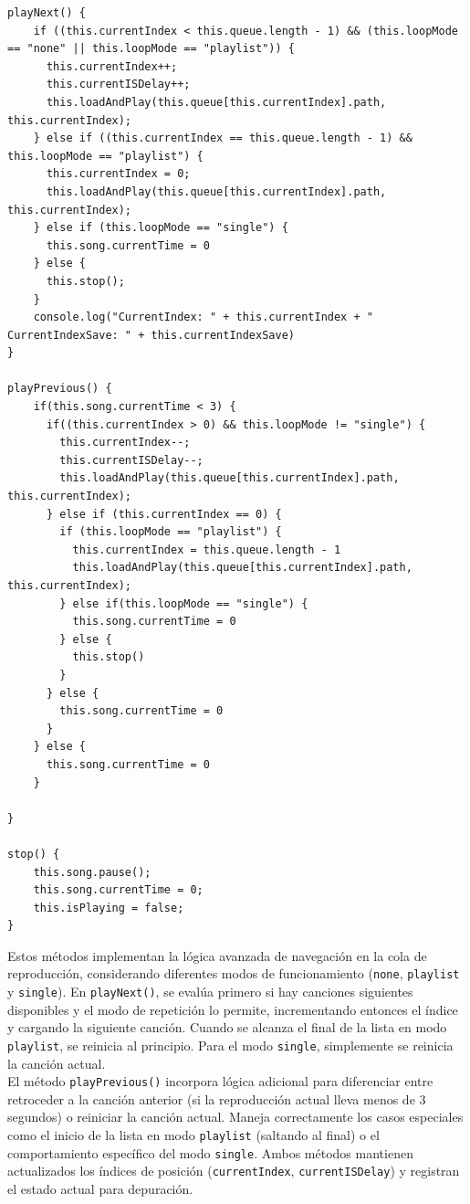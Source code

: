 \documentclass[11pt, a4paper]{article}
\begin{document}
                \begin{lstlisting}[caption={playNext() y playPrevious()}]
playNext() {
    if ((this.currentIndex < this.queue.length - 1) && (this.loopMode == "none" || this.loopMode == "playlist")) {
      this.currentIndex++;
      this.currentISDelay++;
      this.loadAndPlay(this.queue[this.currentIndex].path, this.currentIndex);
    } else if ((this.currentIndex == this.queue.length - 1) && this.loopMode == "playlist") {
      this.currentIndex = 0;
      this.loadAndPlay(this.queue[this.currentIndex].path, this.currentIndex);
    } else if (this.loopMode == "single") {
      this.song.currentTime = 0
    } else {
      this.stop();
    }
    console.log("CurrentIndex: " + this.currentIndex + " CurrentIndexSave: " + this.currentIndexSave)
}

playPrevious() {
    if(this.song.currentTime < 3) {
      if((this.currentIndex > 0) && this.loopMode != "single") {
        this.currentIndex--;
        this.currentISDelay--;
        this.loadAndPlay(this.queue[this.currentIndex].path, this.currentIndex);
      } else if (this.currentIndex == 0) {
        if (this.loopMode == "playlist") {
          this.currentIndex = this.queue.length - 1
          this.loadAndPlay(this.queue[this.currentIndex].path, this.currentIndex);
        } else if(this.loopMode == "single") {
          this.song.currentTime = 0
        } else {
          this.stop()
        }
      } else {
        this.song.currentTime = 0
      }
    } else {
      this.song.currentTime = 0
    }
    
}

stop() {
    this.song.pause();
    this.song.currentTime = 0;
    this.isPlaying = false;
}
                \end{lstlisting}

                Estos métodos implementan la lógica avanzada de navegación en la cola de reproducción, considerando diferentes modos de funcionamiento (\verb|none|, \verb|playlist| y \verb|single|). En \verb|playNext()|, se evalúa primero si hay canciones siguientes disponibles y el modo de repetición lo permite, incrementando entonces el índice y cargando la siguiente canción. Cuando se alcanza el final de la lista en modo \verb|playlist|, se reinicia al principio. Para el modo \verb|single|, simplemente se reinicia la canción actual. \\

                El método \verb|playPrevious()| incorpora lógica adicional para diferenciar entre retroceder a la canción anterior (si la reproducción actual lleva menos de 3 segundos) o reiniciar la canción actual. Maneja correctamente los casos especiales como el inicio de la lista en modo \verb|playlist| (saltando al final) o el comportamiento específico del modo \verb|single|. Ambos métodos mantienen actualizados los índices de posición (\verb|currentIndex|, \verb|currentISDelay|) y registran el estado actual para depuración. \\
\end{document}
